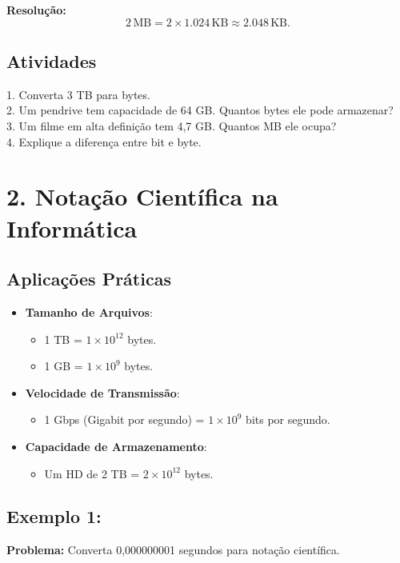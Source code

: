 \documentclass[11pt]{article}
\begin{document}
\begin{multicols}{2}
\textbf{Resolução:}
\[
2 \, \text{MB} = 2 \times 1.024 \, \text{KB} \approx  2.048 \, \text{KB}.
\]

\subsection*{Atividades}
1. Converta 3 TB para bytes. \\
2. Um pendrive tem capacidade de 64 GB. Quantos bytes ele pode armazenar? \\
3. Um filme em alta definição tem 4,7 GB. Quantos MB ele ocupa? \\
4. Explique a diferença entre bit e byte.

\section*{2. Notação Científica na Informática}

\subsection*{Aplicações Práticas}
\begin{itemize}
    \item \textbf{Tamanho de Arquivos}:
    \begin{itemize}
        \item 1 TB = \(1 \times 10^{12}\) bytes.
        \item 1 GB = \(1 \times 10^9\) bytes.
    \end{itemize}
    \item \textbf{Velocidade de Transmissão}:
    \begin{itemize}
        \item 1 Gbps (Gigabit por segundo) = \(1 \times 10^9\) bits por segundo.
    \end{itemize}
    \item \textbf{Capacidade de Armazenamento}:
    \begin{itemize}
        \item Um HD de 2 TB = \(2 \times 10^{12}\) bytes.
    \end{itemize}
\end{itemize}

\subsection*{Exemplo 1:}
\textbf{Problema:} Converta 0,000000001 segundos para notação científica.


\end{multicols}
\end{document}
